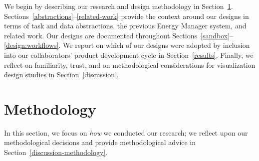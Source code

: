\documentclass[journal]{vgtc}                %
\newcommand{\bstart}[1]{\vspace{1mm} \noindent{\textbf{#1:}}}
\begin{document}
\bstart{Outline} We begin by describing our research and design methodology in Section~\ref{methodology}.
Sections~\ref{abstractions}--\ref{related-work} provide the context around our designs in terms of task and data abstractions, the previous Energy Manager system, and related work. 
Our designs are documented throughout Sections~\ref{sandbox}--\ref{design:workflows}. 
We report on which of our designs were adopted by inclusion into our collaborators' product development cycle in Section~\ref{results}.
Finally, we reflect on familiarity, trust, and on methodological considerations for visualization design studies in Section~\ref{discussion}.


\section{Methodology}
\label{methodology}


In this section, we focus on {\it how} we conducted our research; we reflect upon our methodological decisions and provide methodological advice in Section~\ref{discussion-methodology}. 
\end{document}
